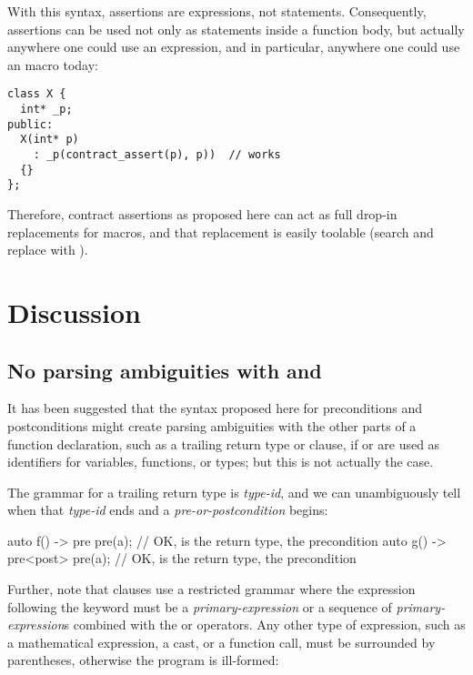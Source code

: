 With this syntax, assertions are expressions, not statements. Consequently, assertions can be used not only as statements inside a function body, but actually anywhere one could use an expression, and in particular, anywhere one could use an  macro today:

\begin{lstlisting}
class X {
  int* _p;
public:
  X(int* p)
    : _p(contract_assert(p), p))  // works
  {}
};
\end{lstlisting}

Therefore, contract assertions as proposed here can act as full drop-in replacements for  macros, and that replacement is easily toolable (search and replace  with ).

\section{Discussion}

\subsection{No parsing ambiguities with  and }
\label{subsec:noambig}

It has been suggested that the syntax proposed here for preconditions and postconditions might create parsing ambiguities with the other parts of a function declaration, such as a trailing return type or  clause, if  or  are used as identifiers for variables, functions, or types; but this is not actually the case.

The grammar for a trailing return type is \tcode{->} \emph{type-id}, and we can unambiguously tell when that \emph{type-id} ends and a \emph{pre-or-postcondition} begins:

\begin{codeblock}
auto f() -> pre pre(a);   // OK,  is the return type,  the precondition
auto g() -> pre<post> pre(a);  // OK,  is the return type,  the precondition
\end{codeblock}

Further, note that  clauses use a restricted grammar where the expression following the  keyword must be a \emph{primary-expression} or a sequence of \emph{primary-expression}s combined with the \tcode{\&\&} or \tcode{||} operators. Any other type of expression, such as a mathematical expression, a cast, or a function call, must be surrounded by parentheses, otherwise the program is ill-formed:

